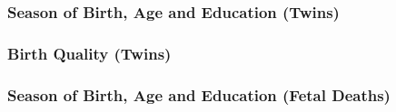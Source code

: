 \documentclass[10pt,letterpaper,subeqn]{beamer}
\begin{document}
\begin{frame}[label=NVSStwin]
\frametitle{Season of Birth, Age and Education (Twins)}

\end{frame}

\begin{frame}[label=NVSSQualitytwin]
\frametitle{Birth Quality (Twins)}

\end{frame}

\begin{frame}[label=NVSSFD]
\frametitle{Season of Birth, Age and Education (Fetal Deaths)}

\end{frame}
\end{document}
